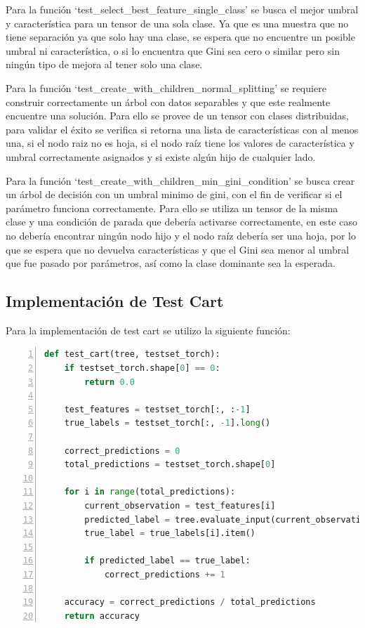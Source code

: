 \documentclass[12pt,a4paper]{article}
\begin{document}
Para la función `test_select_best_feature_single_class' se busca el mejor umbral y característica para un tensor de una sola clase.
Ya que es una muestra que no tiene separación ya que solo hay una clase, se espera que no encuentre un posible umbral ni característica,
o si lo encuentra que Gini sea cero o similar pero sin ningún tipo de mejora al tener solo una clase.

Para la función `test_create_with_children_normal_splitting' se requiere construir correctamente un árbol con datos separables
y que este realmente encuentre una solución.
Para ello se provee de un tensor con clases distribuidas, para validar
el éxito se verifica si retorna una lista de características con al menos una, si el nodo raiz no es hoja,
si el nodo raíz tiene los valores de característica y umbral correctamente asignados y si existe algún hijo
de cualquier lado.

Para la función `test_create_with_children_min_gini_condition'
se busca crear un árbol de decisión
con un umbral minimo de gini, con el fin
de verificar si el parámetro funciona correctamente. Para ello se utiliza un tensor de la misma clase y una condición de parada
que debería activarse correctamente, en este caso no debería encontrar ningún nodo hijo y el nodo raíz debería ser una hoja,
por lo que se espera que no devuelva características y que el Gini sea menor al umbral que fue pasado por parámetros, así como
la clase dominante sea la esperada.

\subsection{Implementación de Test Cart}\label{subsec:implementacion-de-test-cart}

Para la implementación de test cart se utilizo la siguiente función:

    \begin{lstlisting}[language=Python, numbers=left, basicstyle=\ttfamily\small,label={lst:lstlisting9}]
  def test_cart(tree, testset_torch):
    if testset_torch.shape[0] == 0:
        return 0.0

    test_features = testset_torch[:, :-1]
    true_labels = testset_torch[:, -1].long()

    correct_predictions = 0
    total_predictions = testset_torch.shape[0]

    for i in range(total_predictions):
        current_observation = test_features[i]
        predicted_label = tree.evaluate_input(current_observation)
        true_label = true_labels[i].item()

        if predicted_label == true_label:
            correct_predictions += 1

    accuracy = correct_predictions / total_predictions
    return accuracy
    \end{lstlisting}
\end{document}

